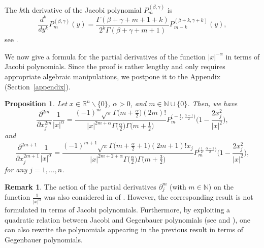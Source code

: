 \documentclass[reqno,11pt]{amsart}
\newtheorem{proposition}[theorem]{Proposition}
\theoremstyle{definition}
\newtheorem{remark}[theorem]{Remark}
\def\R{\mathbb{R}}
\begin{document}
The $k$th derivative of the Jacobi polynomial $P_{m}^{(\beta, \gamma)}$ is
\begin{equation}
	\label{derJ}
	\frac{d^k}{d y^k} P_{m}^{(\beta, \gamma)}(y)= \frac{\Gamma(\beta+\gamma+m+1+k)}{2^k \Gamma(\beta+\gamma+m+1)}P_{m-k}^{(\beta+k, \gamma+k)}(y),
\end{equation}
see \cite[Eq. (3.101)]{STW}.

We now give a formula for the partial derivatives of the function $|x|^{-\alpha}$ in terms of Jacobi polynomials. Since the proof is rather lengthy and only requires appropriate algebraic manipulations, we postpone it to the Appendix (Section~\ref{appendix}).
\begin{proposition}\label{PROPdermodulus1}
	Let $x\in \R^n\backslash \{0\}$, $\alpha>0$, and $m\in \mathbb{N}\cup\{0\}$. Then, we have
	\begin{equation}
		\label{J11}
		\frac{\partial^{2m}}{\partial x_j^{2m}}\frac{1}{|x|^{\alpha}} = \frac{(-1)^m \sqrt{\pi} \Gamma\big( m+\frac{\alpha}{2}\big) (2m)! }{|x|^{2m+\alpha}\Gamma\big(\frac{\alpha}{2}\big)\Gamma\big( m+\frac{1}{2}\big)}P_m^{ \big(-\frac{1}{2},\frac{\alpha-1}{2}\big)}\bigg(1-\frac{2x_j^2}{|x|^2} \bigg),
	\end{equation}
	and
	\begin{equation}
		\label{J21}
		\frac{\partial^{2m+1}}{\partial x_j^{2m+1}}\frac{1}{|x|^{\alpha}} = \frac{(-1)^{m+1} \sqrt{\pi}\Gamma\big(m+\frac{\alpha}{2}+1\big)(2m+1)!x_j}{|x|^{2m+2+\alpha} \Gamma\big(\frac{\alpha}{2}\big)\Gamma\big(m+\frac{3}{2}\big)} P_m^{\big( \frac{1}{2},\frac{\alpha-1}{2}\big)}\bigg(1-\frac{2x_j^2}{|x|^2} \bigg),
	\end{equation}
	for any $j=1,\ldots,n$.
\end{proposition}


\begin{remark}
	The action of the partial derivatives $\partial_j^m$ (with $m \in \mathbb{N}$) on the function $\frac{1}{|x|^\alpha}$ was also considered in of \cite[Chapter~1]{DX}. However, the corresponding result is not formulated in terms of Jacobi polynomials. Furthermore, by exploiting a quadratic relation between Jacobi and Gegenbauer polynomials (see \cite{ESVG} and \cite{S39}), one can also rewrite the polynomials appearing in the previous result in terms of Gegenbauer polynomials.
\end{remark}
\end{document}
